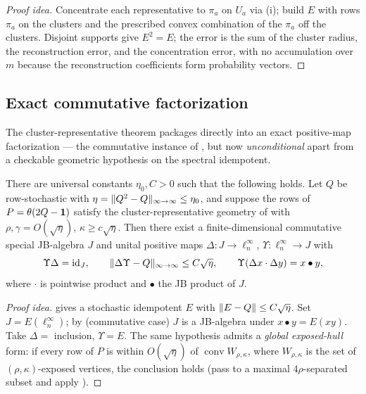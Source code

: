 \begin{proof}[Proof idea]
Concentrate each representative to $\pi_a$ on $U_a$ via
(i); build $E$ with rows $\pi_a$ on the clusters and
the prescribed convex combination of the $\pi_a$ off the clusters. Disjoint
supports give $E^2=E$; the error is the sum of the cluster radius, the
reconstruction error, and the concentration error, with no accumulation over $m$
because the reconstruction coefficients form probability vectors.
\end{proof}

\subsection{Exact commutative factorization}

The cluster-representative theorem packages directly into an exact
positive-map factorization --- the commutative instance of
, but now \emph{unconditional} apart from a checkable
geometric hypothesis on the spectral idempotent.

\begin{theorem}\label{thm:classical-factorization}
There are universal constants $\eta_0,C>0$ such that the following holds. Let
$Q$ be row-stochastic with
$\eta=\lVert Q^2-Q \rVert_{\infty\to\infty}\le\eta_0$, and suppose the rows of
$P=\theta(2Q-\mathbf{1})$ satisfy the cluster-representative geometry of
 with $\rho,\gamma=O(\sqrt\eta)$,
$\kappa\ge c\sqrt\eta$. Then there exist a finite-dimensional commutative
special JB-algebra $J$ and unital positive maps
$\Delta\colon J\to\ell^{\infty}_n$, $\Upsilon\colon\ell^{\infty}_n\to J$
with
\[
  \Upsilon\Delta=\mathrm{id}_J,\qquad
  \lVert \Delta\Upsilon-Q \rVert_{\infty\to\infty}\le C\sqrt{\eta},\qquad
  \Upsilon(\Delta x\cdot\Delta y)=x\bullet y ,
\]
where $\cdot$ is pointwise product and $\bullet$ the JB product of $J$.
\end{theorem}

\begin{proof}[Proof idea]
 gives a stochastic idempotent $E$ with
$\lVert E-Q \rVert\le C\sqrt\eta$. Set $J=E(\ell^{\infty}_n)$; by
 (commutative case) $J$ is a JB-algebra under
$x\bullet y=E(xy)$. Take $\Delta=$ inclusion, $\Upsilon=E$. The same hypothesis
admits a \emph{global exposed-hull} form: if every row of $P$ is within
$O(\sqrt\eta)$ of $\operatorname{conv}W_{\rho,\kappa}$, where $W_{\rho,\kappa}$ is
the set of $(\rho,\kappa)$-exposed vertices, the conclusion holds (pass to a
maximal $4\rho$-separated subset and apply ).
\end{proof}

